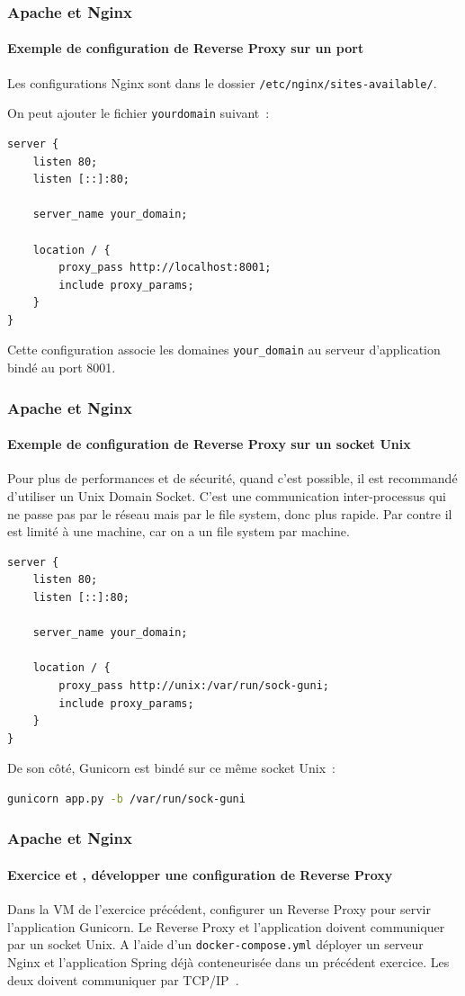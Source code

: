 \documentclass{beamer}
\begin{document}
    \begin{frame}[fragile]
        \transdissolve
        \frametitle{Apache et Nginx}
        \framesubtitle{Exemple de configuration de Reverse Proxy sur un port}
        Les configurations Nginx sont dans le dossier \lstinline{/etc/nginx/sites-available/}.

        On peut ajouter le fichier \lstinline{yourdomain} suivant~:
        \begin{lstlisting}
server {
    listen 80;
    listen [::]:80;

    server_name your_domain;

    location / {
        proxy_pass http://localhost:8001;
        include proxy_params;
    }
}
        \end{lstlisting}
        Cette configuration associe les domaines \lstinline{your_domain} au serveur d'application bindé au port 8001.
    \end{frame}

    \begin{frame}[fragile]
        \transdissolve
        \frametitle{Apache et Nginx}
        \framesubtitle{Exemple de configuration de Reverse Proxy sur un socket Unix}
        Pour plus de performances et de sécurité, quand c'est possible, il est recommandé d'utiliser un Unix Domain Socket.
        C'est une communication inter-processus qui ne passe pas par le réseau mais par le file system, donc plus rapide.
        Par contre il est limité à une machine, car on a un file system par machine.
        \begin{lstlisting}
server {
    listen 80;
    listen [::]:80;

    server_name your_domain;

    location / {
        proxy_pass http://unix:/var/run/sock-guni;
        include proxy_params;
    }
}
        \end{lstlisting}
        De son côté, Gunicorn est bindé sur ce même socket Unix~:
        \begin{lstlisting}[language=bash]
gunicorn app.py -b /var/run/sock-guni
        \end{lstlisting}
    \end{frame}

    \begin{frame}
        \transdissolve
        \frametitle{Apache et Nginx}
        \framesubtitle{Exercice \execcounterdispinc{} et \execcounterdispinc{}, développer une configuration de Reverse Proxy}
        \setlength\parindent{24pt}
        Dans la VM de l'exercice précédent, configurer un Reverse Proxy pour servir l'application Gunicorn.
        Le Reverse Proxy et l'application doivent communiquer par un socket Unix.
        \bigbreak
        A l'aide d'un \lstinline{docker-compose.yml} déployer un serveur Nginx et l'application Spring déjà conteneurisée dans un précédent exercice.
        Les deux doivent communiquer par TCP/IP~.
        \setlength\parindent{0pt}
    \end{frame}
\end{document}
